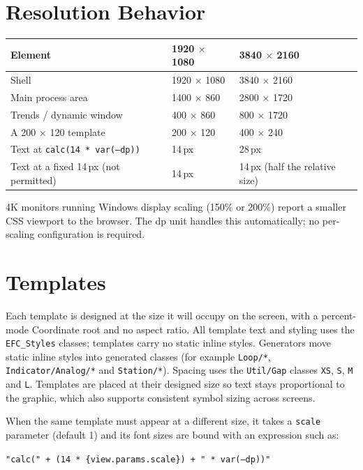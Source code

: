 \section{Resolution Behavior}
\begin{center}
\begin{tabular}{@{}P{7.42cm}P{4.76cm}P{4.76cm}@{}}
\toprule
{}\textbf{Element} & \textbf{1920 $\times$ 1080} & \textbf{3840 $\times$ 2160} \\
\midrule
Shell & 1920 $\times$ 1080 & 3840 $\times$ 2160 \\
Main process area & 1400 $\times$ 860 & 2800 $\times$ 1720 \\
Trends / dynamic window & 400 $\times$ 860 & 800 $\times$ 1720 \\
A 200 $\times$ 120 template & 200 $\times$ 120 & 400 $\times$ 240 \\
Text at \texttt{calc(14 * var(--dp))} & 14\,px & 28\,px \\
Text at a fixed 14\,px (not permitted) & 14\,px & 14\,px (half the relative size) \\
\bottomrule
\end{tabular}
\end{center}
4K monitors running Windows display scaling (150\% or 200\%) report a smaller CSS viewport to the browser. The dp unit handles this automatically; no per-scaling configuration is required.

\section{Templates}
Each template is designed at the size it will occupy on the screen, with a percent-mode Coordinate root and no aspect ratio. All template text and styling uses the \texttt{EFC\_Styles} classes; templates carry no static inline styles. Generators move static inline styles into generated classes (for example \texttt{Loop/*}, \texttt{Indicator/Analog/*} and \texttt{Station/*}). Spacing uses the \texttt{Util/Gap} classes \texttt{XS}, \texttt{S}, \texttt{M} and \texttt{L}. Templates are placed at their designed size so text stays proportional to the graphic, which also supports consistent symbol sizing across screens.

When the same template must appear at a different size, it takes a \texttt{scale} parameter (default 1) and its font sizes are bound with an expression such as:
\begin{center}\texttt{"calc(" + (14 * \{view.params.scale\}) + " * var(--dp))"}\end{center}

